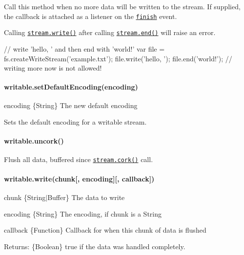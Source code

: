 Call this method when no more data will be written to the stream. If supplied, the callback is attached as a listener on the \href{#stream_event_finish}{\tt {\ttfamily \textquotesingle{}finish\textquotesingle{}}} event.

Calling \href{#stream_writable_write_chunk_encoding_callback}{\tt {\ttfamily stream.\+write()}} after calling \href{#stream_writable_end_chunk_encoding_callback}{\tt {\ttfamily stream.\+end()}} will raise an error.


\begin{DoxyCode}
// write 'hello, ' and then end with 'world!'
var file = fs.createWriteStream('example.txt');
file.write('hello, ');
file.end('world!');
// writing more now is not allowed!
\end{DoxyCode}


\paragraph*{writable.\+set\+Default\+Encoding(encoding)}


\begin{DoxyItemize}
\item {\ttfamily encoding} \{String\} The new default encoding
\end{DoxyItemize}

Sets the default encoding for a writable stream.

\paragraph*{writable.\+uncork()}

Flush all data, buffered since \href{#stream_writable_cork}{\tt {\ttfamily stream.\+cork()}} call.

\paragraph*{writable.\+write(chunk\mbox{[}, encoding\mbox{]}\mbox{[}, callback\mbox{]})}


\begin{DoxyItemize}
\item {\ttfamily chunk} \{String$\vert$\+Buffer\} The data to write
\item {\ttfamily encoding} \{String\} The encoding, if {\ttfamily chunk} is a String
\item {\ttfamily callback} \{Function\} Callback for when this chunk of data is flushed
\item Returns\+: \{Boolean\} {\ttfamily true} if the data was handled completely.
\end{DoxyItemize}

